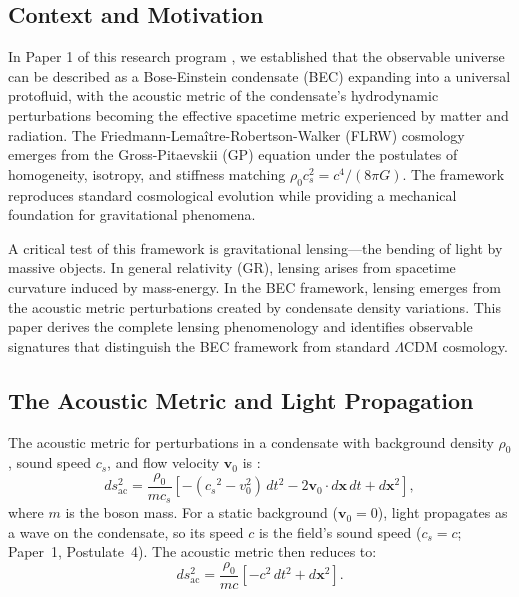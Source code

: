 \documentclass[11pt,a4paper]{article}
\newcommand{\cs}{\ensuremath{c_s}}
\theoremstyle{definition}
\theoremstyle{remark}
\begin{document}
\subsection{Context and Motivation}
\label{sec:motivation}

In Paper 1 of this research program \cite{Paper1}, we established that the observable universe can be described as a Bose-Einstein condensate (BEC) expanding into a universal protofluid, with the acoustic metric of the condensate's hydrodynamic perturbations becoming the effective spacetime metric experienced by matter and radiation. The Friedmann-Lema\^itre-Robertson-Walker (FLRW) cosmology emerges from the Gross-Pitaevskii (GP) equation under the postulates of homogeneity, isotropy, and stiffness matching $\rho_0 c_s^2 = c^4/(8\pi G)$. The framework reproduces standard cosmological evolution while providing a mechanical foundation for gravitational phenomena.

A critical test of this framework is gravitational lensing---the bending of light by massive objects. In general relativity (GR), lensing arises from spacetime curvature induced by mass-energy. In the BEC framework, lensing emerges from the acoustic metric perturbations created by condensate density variations. This paper derives the complete lensing phenomenology and identifies observable signatures that distinguish the BEC framework from standard $\Lambda$CDM cosmology.

\subsection{The Acoustic Metric and Light Propagation}
\label{sec:acoustic_metric_review}

The acoustic metric for perturbations in a condensate with background density $\rho_0$, sound speed $\cs$, and flow velocity $\mathbf{v}_0$ is \cite{Unruh1981,Barcelo2005}:
\begin{equation}
\label{eq:acoustic_metric}
ds_{\mathrm{ac}}^2 = \frac{\rho_0}{m \cs} \left[ -(\cs^2 - v_0^2) \, dt^2 - 2 \mathbf{v}_0 \cdot d\mathbf{x} \, dt + d\mathbf{x}^2 \right],
\end{equation}
where $m$ is the boson mass. For a static background ($\mathbf{v}_0 = 0$), light propagates as a wave on the condensate, so its speed $c$ is the field's sound speed ($\cs = c$; Paper~1, Postulate~4). The acoustic metric then reduces to:
\begin{equation}
\label{eq:acoustic_static}
ds_{\mathrm{ac}}^2 = \frac{\rho_0}{mc} \left[ -c^2 \, dt^2 + d\mathbf{x}^2 \right].
\end{equation}
\end{document}
